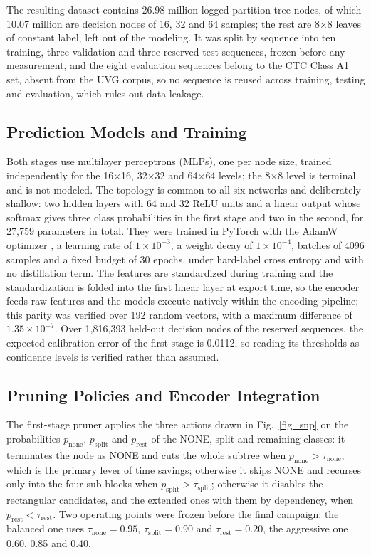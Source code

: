 \documentclass[conference]{IEEEtran}
\begin{document}
The resulting dataset contains 26.98 million logged partition-tree nodes, of
which 10.07 million are decision nodes of 16, 32 and 64 samples; the rest are
8$\times$8 leaves of constant label, left out of the modeling. It was split by
sequence into ten training, three validation and three reserved test sequences,
frozen before any measurement, and the eight evaluation sequences belong to the
CTC Class A1 set, absent from the UVG corpus, so no sequence is reused across
training, testing and evaluation, which rules out data leakage.

\subsection{Prediction Models and Training}

Both stages use multilayer perceptrons (MLPs), one per node size, trained
independently for the 16$\times$16, 32$\times$32 and 64$\times$64 levels; the
8$\times$8 level is terminal and is not modeled. The topology is common to all six
networks and deliberately shallow: two hidden layers with 64 and 32 ReLU units
and a linear output whose softmax gives three class probabilities in the first
stage and two in the second, for 27{,}759 parameters in total. They were trained
in PyTorch \cite{pytorch} with the AdamW optimizer \cite{adamw}, a learning rate
of $1 \times 10^{-3}$, a weight decay of $1 \times 10^{-4}$, batches of 4096
samples and a fixed budget of 30 epochs, under hard-label cross entropy and with
no distillation term. The features are standardized during training and the
standardization is folded into the first linear layer at export time, so the
encoder feeds raw features and the models execute natively within the encoding
pipeline; this parity was verified over 192 random vectors, with a maximum
difference of $1.35 \times 10^{-7}$. Over 1{,}816{,}393 held-out decision nodes of
the reserved sequences, the expected calibration error of the first stage is
0.0112, so reading its thresholds as confidence levels is verified rather than
assumed.

\subsection{Pruning Policies and Encoder Integration}

The first-stage pruner applies the three actions drawn in Fig.~\ref{fig_snp} on
the probabilities $p_{\mathrm{none}}$, $p_{\mathrm{split}}$ and
$p_{\mathrm{rest}}$ of the NONE, split and remaining classes: it terminates the
node as NONE and cuts the whole subtree when $p_{\mathrm{none}} >
\tau_{\mathrm{none}}$, which is the primary lever of time savings; otherwise it
skips NONE and recurses only into the four sub-blocks when $p_{\mathrm{split}} >
\tau_{\mathrm{split}}$; otherwise it disables the rectangular candidates, and the
extended ones with them by dependency, when $p_{\mathrm{rest}} <
\tau_{\mathrm{rest}}$. Two operating points were frozen before the final
campaign: the balanced one uses $\tau_{\mathrm{none}} = 0.95$,
$\tau_{\mathrm{split}} = 0.90$ and $\tau_{\mathrm{rest}} = 0.20$, the aggressive
one 0.60, 0.85 and 0.40.
\end{document}
